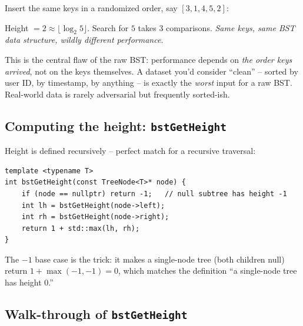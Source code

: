 \documentclass[11pt]{article}
\begin{document}
Insert the same keys in a randomized order, say $[3, 1, 4, 5, 2]$:

\begin{center}
\end{center}

Height $= 2 \approx \lfloor \log_2 5 \rfloor$. Search for $5$ takes 3 comparisons. \emph{Same keys, same BST data structure, wildly different performance.}

\begin{ideabox}
This is the central flaw of the raw BST: performance depends on \emph{the order keys arrived}, not on the keys themselves. A dataset you'd consider ``clean'' -- sorted by user ID, by timestamp, by anything -- is exactly the \emph{worst} input for a raw BST. Real-world data is rarely adversarial but frequently sorted-ish.
\end{ideabox}

\subsection*{Computing the height: \texttt{bstGetHeight}}

Height is defined recursively -- perfect match for a recursive traversal:

\begin{lstlisting}
template <typename T>
int bstGetHeight(const TreeNode<T>* node) {
    if (node == nullptr) return -1;   // null subtree has height -1
    int lh = bstGetHeight(node->left);
    int rh = bstGetHeight(node->right);
    return 1 + std::max(lh, rh);
}
\end{lstlisting}

The $-1$ base case is the trick: it makes a single-node tree (both children null) return $1 + \max(-1, -1) = 0$, which matches the definition ``a single-node tree has height 0.''

\subsection*{Walk-through of \texttt{bstGetHeight}}
\end{document}
